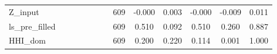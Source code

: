 \begin{table}[htbp]
\begin{tabular}{l*{2}{cccccc}}
Z\_input     &            &            &            &            &            &            &         609&      -0.000&       0.003&      -0.000&      -0.009&       0.011\\
ls\_pre\_filled&            &            &            &            &            &            &         609&       0.510&       0.092&       0.510&       0.260&       0.887\\
HHI\_dom     &            &            &            &            &            &            &         609&       0.200&       0.220&       0.114&       0.001&       1.000\\
\hline\hline
\end{tabular}
\end{table}
